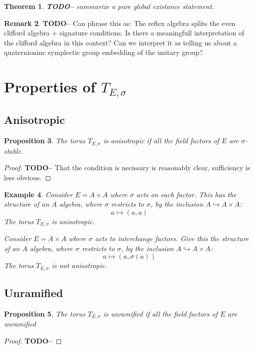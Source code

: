 \documentclass{article}
\theoremstyle{plain}
\newtheorem{theorem}{Theorem}[section]
\newtheorem{proposition}[theorem]{Proposition}
\newtheorem{example}[theorem]{Example}
\theoremstyle{definition}
\newtheorem{remark}[theorem]{Remark}
\numberwithin{equation}{section}
\newcommand{\TODO}[1]{\textbf{TODO-#1}}
\begin{document}
\begin{theorem}
\TODO - summarize a pure global existance statement.
\end{theorem}

\begin{remark}
\TODO - Can phrase this as: The reflex algebra splits the even clifford algebra + signature conditions.
Is there a meaningfull interpretation of the clifford algebra in this context?
Can we interpret it as telling us about a quaternioninc symplectic group embedding of the unitary group?
\end{remark}




\section{Properties of $T_{E,\sigma}$}

\subsection{Anisotropic}

\begin{proposition}
The torus $T_{E,\sigma}$ is anisotropic if all the field factors of $E$ are $\sigma$-stable.
\end{proposition}
\begin{proof}
\TODO-
That the condition is necissary is reasonably clear, sufficiency is less obvious.
\end{proof}

\begin{example}
Consider $E = A \times A$ where $\sigma$ acts on each factor.
This has the structure of an $A$ algebra, where $\sigma$ restricts to $\sigma$, by the inclusion $A\hookrightarrow A\times A$:
\[ a \mapsto (a,a) \]
The torus $T_{E,\sigma}$ is anisotropic.

\bigskip
Consider $E = A \times A$ where $\sigma$ acts to interchange factors.
Give this the structure of an $A$ algebra, where $\sigma$ restricts to $\sigma$, by the inclusion $A\hookrightarrow A\times A$:
\[ a \mapsto (a,\sigma(a)) \]
The torus $T_{E,\sigma}$ is not anisotropic.
\end{example}


\subsection{Unramified}

\begin{proposition}
The torus $T_{E,\sigma}$ is unramified if all the field factors of $E$ are unramified
\end{proposition}
\begin{proof}
\TODO-
\end{proof}
\end{document}
